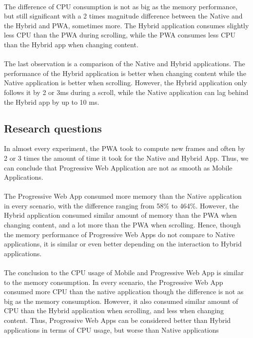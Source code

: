 \documentclass{kththesis}
\begin{document}
\paragraph{}
The difference of CPU consumption is not as big as the memory performance, but still significant with a 2 times magnitude difference between the Native and the Hybrid and PWA, sometimes more. The Hybrid application consumes slightly less CPU than the PWA during scrolling, while the PWA consumes less CPU than the Hybrid app when changing content. 

\paragraph{}
The last observation is a comparison of the Native and Hybrid applications. The performance of the Hybrid application is better when changing content while the Native application is better when scrolling. However, the Hybrid application only follows it by 2 or 3ms during a scroll, while the Native application can lag behind the Hybrid app by up to 10 ms. 

\subsection{Research questions}
In almost every experiment, the PWA took to compute new frames and often by 2 or 3 times the amount of time it took for the Native and Hybrid App. Thus, we can conclude that Progressive Web Application are not as smooth as Mobile Applications.

\paragraph{}
The Progressive Web App consumed more memory than the Native application in every scenario, with the difference ranging from 58\% to 464\%. However, the Hybrid application consumed similar amount of memory than the PWA when changing content, and a lot more than the PWA when scrolling. Hence, though the memory performance of Progressive Web Apps do not compare to Native applications, it is similar or even better depending on the interaction to Hybrid applications.

\paragraph{}
The conclusion to the CPU usage of Mobile and Progressive Web App is similar to the memory consumption. In every scenario, the Progressive Web App consumed more CPU than the native application though the difference is not as big as the memory consumption. However, it also consumed similar amount of CPU than the Hybrid application when scrolling, and less when changing content. Thus, Progressive Web Apps can be considered better than Hybrid applications in terms of CPU usage, but worse than Native applications 
\end{document}
